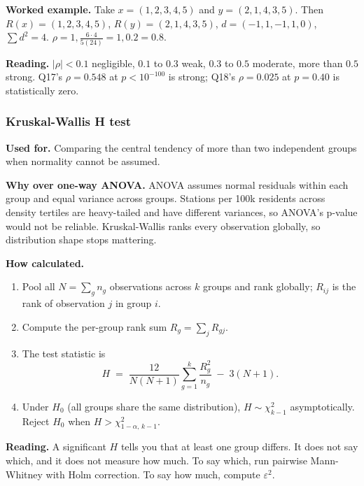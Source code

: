 \textbf{Worked example.} Take $x = (1, 2, 3, 4, 5)$ and
$y = (2, 1, 4, 3, 5)$. Then $R(x) = (1, 2, 3, 4, 5)$, $R(y) = (2, 1, 4, 3, 5)$,
$d = (-1, 1, -1, 1, 0)$, $\sum d^2 = 4$.
$\rho = 1, \tfrac{6 \cdot 4}{5(24)} = 1, 0.2 = 0.8$.

\textbf{Reading.} $|\rho| < 0.1$ negligible, $0.1$ to $0.3$ weak,
$0.3$ to $0.5$ moderate, more than $0.5$ strong. Q17's
$\rho = 0.548$ at $p < 10^{-100}$ is strong; Q18's $\rho = 0.025$ at
$p = 0.40$ is statistically zero.

\subsubsection{Kruskal-Wallis H test}

\textbf{Used for.} Comparing the central tendency of more than two
independent groups when normality cannot be assumed.

\textbf{Why over one-way ANOVA.} ANOVA assumes normal residuals
within each group and equal variance across groups. Stations per 100k
residents across density tertiles are heavy-tailed and have different
variances, so ANOVA's p-value would not be reliable. Kruskal-Wallis
ranks every observation globally, so distribution shape stops
mattering.

\textbf{How calculated.}

\begin{enumerate}
 \item Pool all $N = \sum_g n_g$ observations across $k$ groups and
 rank globally; $R_{ij}$ is the rank of observation $j$ in
 group $i$.
 \item Compute the per-group rank sum $R_g = \sum_j R_{gj}$.
 \item The test statistic is
 \begin{equation*}
 H \;=\; \frac{12}{N(N+1)} \sum_{g=1}^{k} \frac{R_g^2}{n_g} \;-\; 3(N+1).
 \end{equation*}
 \item Under $H_0$ (all groups share the same distribution),
 $H \sim \chi^2_{k-1}$ asymptotically. Reject $H_0$ when
 $H > \chi^2_{1-\alpha,\, k-1}$.
\end{enumerate}

\textbf{Reading.} A significant $H$ tells you that at least one group
differs. It does not say which, and it does not measure how much. To
say which, run pairwise Mann-Whitney with Holm correction. To say
how much, compute $\varepsilon^2$.

